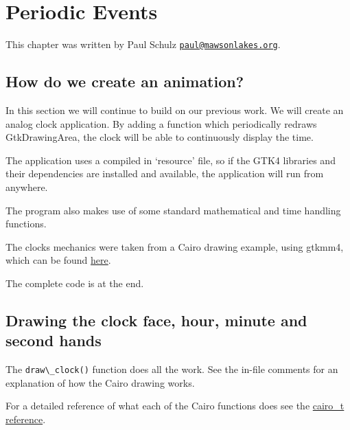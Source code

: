 \section{Periodic Events}\label{periodic-events}

This chapter was written by Paul Schulz
\href{mailto:paul@mawsonlakes.org}{\nolinkurl{paul@mawsonlakes.org}}.

\subsection{How do we create an
animation?}\label{how-do-we-create-an-animation}

In this section we will continue to build on our previous work. We will
create an analog clock application. By adding a function which
periodically redraws GtkDrawingArea, the clock will be able to
continuously display the time.

The application uses a compiled in `resource' file, so if the GTK4
libraries and their dependencies are installed and available, the
application will run from anywhere.

The program also makes use of some standard mathematical and time
handling functions.

The clocks mechanics were taken from a Cairo drawing example, using
gtkmm4, which can be found
\href{https://developer-old.gnome.org/gtkmm-tutorial/stable/sec-drawing-clock-example.html.en}{here}.

The complete code is at the end.

\subsection{Drawing the clock face, hour, minute and second
hands}\label{drawing-the-clock-face-hour-minute-and-second-hands}

The \passthrough{\lstinline!draw\_clock()!} function does all the work.
See the in-file comments for an explanation of how the Cairo drawing
works.

For a detailed reference of what each of the Cairo functions does see
the
\href{https://www.cairographics.org/manual/cairo-cairo-t.html}{cairo\_t
reference}.


